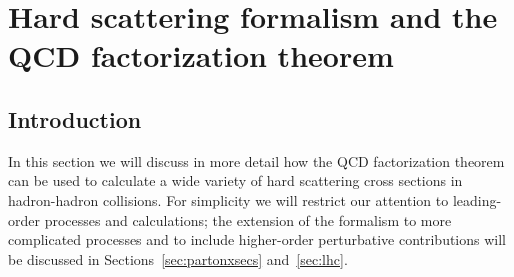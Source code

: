 \documentclass[12pt]{iopart}
\begin{document}
\section{Hard scattering formalism and the QCD factorization theorem} 
\label{sec:formalism}
%
\subsection{Introduction}
\label{sec:formintro}

In this section we will discuss in more detail how the QCD factorization theorem can be used to calculate a wide
variety of hard scattering cross sections in hadron-hadron collisions. For simplicity we will restrict our
attention to leading-order processes and calculations; the extension of the formalism to more complicated
processes and to include higher-order perturbative contributions will be discussed in
Sections~\ref{sec:partonxsecs} and~\ref{sec:lhc}.
\end{document}
